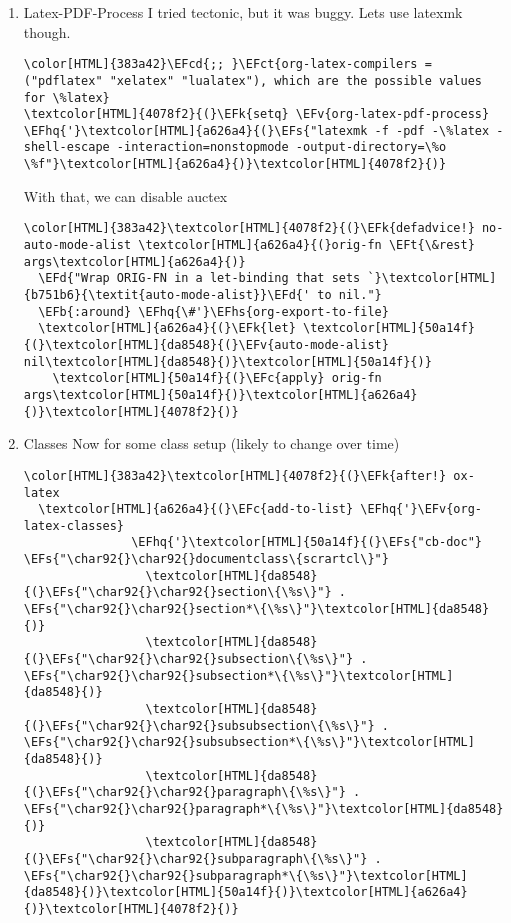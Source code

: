 \documentclass{scrartcl}
\newcommand{\EFk}[1]{\textcolor{EFk}{#1}} %
\newcommand{\EFd}[1]{\textcolor{EFd}{\textit{#1}}} %
\newcommand{\EFt}[1]{\textcolor{EFt}{#1}} %
\newcommand{\EFs}[1]{\textcolor{EFs}{#1}} %
\newcommand{\EFb}[1]{\textcolor{EFb}{#1}} %
\newcommand{\EFct}[1]{\textcolor{EFct}{#1}} %
\newcommand{\EFc}[1]{\textcolor{EFc}{#1}} %
\newcommand{\EFv}[1]{\textcolor{EFv}{#1}} %
\newcommand{\EFcd}[1]{\textcolor{EFcd}{#1}} %
\newcommand{\EFhq}[1]{\textcolor{EFhq}{#1}} %
\newcommand{\EFhs}[1]{\textcolor{EFhs}{#1}} %
\begin{document}
\begin{enumerate}
\item Latex-PDF-Process
\label{sec:org35b1c4f}
I tried tectonic, but it was buggy. Lets use latexmk though.
\begin{Code}
\begin{Verbatim}[]
\color[HTML]{383a42}\EFcd{;; }\EFct{org-latex-compilers = ("pdflatex" "xelatex" "lualatex"), which are the possible values for \%latex}
\textcolor[HTML]{4078f2}{(}\EFk{setq} \EFv{org-latex-pdf-process} \EFhq{'}\textcolor[HTML]{a626a4}{(}\EFs{"latexmk -f -pdf -\%latex -shell-escape -interaction=nonstopmode -output-directory=\%o \%f"}\textcolor[HTML]{a626a4}{)}\textcolor[HTML]{4078f2}{)}
\end{Verbatim}
\end{Code}

With that, we can disable auctex
\begin{Code}
\begin{Verbatim}[]
\color[HTML]{383a42}\textcolor[HTML]{4078f2}{(}\EFk{defadvice!} no-auto-mode-alist \textcolor[HTML]{a626a4}{(}orig-fn \EFt{\&rest} args\textcolor[HTML]{a626a4}{)}
  \EFd{"Wrap ORIG-FN in a let-binding that sets `}\textcolor[HTML]{b751b6}{\textit{auto-mode-alist}}\EFd{' to nil."}
  \EFb{:around} \EFhq{\#'}\EFhs{org-export-to-file}
  \textcolor[HTML]{a626a4}{(}\EFk{let} \textcolor[HTML]{50a14f}{(}\textcolor[HTML]{da8548}{(}\EFv{auto-mode-alist} nil\textcolor[HTML]{da8548}{)}\textcolor[HTML]{50a14f}{)}
    \textcolor[HTML]{50a14f}{(}\EFc{apply} orig-fn args\textcolor[HTML]{50a14f}{)}\textcolor[HTML]{a626a4}{)}\textcolor[HTML]{4078f2}{)}
\end{Verbatim}
\end{Code}

\item Classes
\label{sec:orgf8778f4}
Now for some class setup (likely to change over time)
\begin{Code}
\begin{Verbatim}[]
\color[HTML]{383a42}\textcolor[HTML]{4078f2}{(}\EFk{after!} ox-latex
  \textcolor[HTML]{a626a4}{(}\EFc{add-to-list} \EFhq{'}\EFv{org-latex-classes}
               \EFhq{'}\textcolor[HTML]{50a14f}{(}\EFs{"cb-doc"} \EFs{"\char92{}\char92{}documentclass\{scrartcl\}"}
                 \textcolor[HTML]{da8548}{(}\EFs{"\char92{}\char92{}section\{\%s\}"} . \EFs{"\char92{}\char92{}section*\{\%s\}"}\textcolor[HTML]{da8548}{)}
                 \textcolor[HTML]{da8548}{(}\EFs{"\char92{}\char92{}subsection\{\%s\}"} . \EFs{"\char92{}\char92{}subsection*\{\%s\}"}\textcolor[HTML]{da8548}{)}
                 \textcolor[HTML]{da8548}{(}\EFs{"\char92{}\char92{}subsubsection\{\%s\}"} . \EFs{"\char92{}\char92{}subsubsection*\{\%s\}"}\textcolor[HTML]{da8548}{)}
                 \textcolor[HTML]{da8548}{(}\EFs{"\char92{}\char92{}paragraph\{\%s\}"} . \EFs{"\char92{}\char92{}paragraph*\{\%s\}"}\textcolor[HTML]{da8548}{)}
                 \textcolor[HTML]{da8548}{(}\EFs{"\char92{}\char92{}subparagraph\{\%s\}"} . \EFs{"\char92{}\char92{}subparagraph*\{\%s\}"}\textcolor[HTML]{da8548}{)}\textcolor[HTML]{50a14f}{)}\textcolor[HTML]{a626a4}{)}\textcolor[HTML]{4078f2}{)}
\end{Verbatim}
\end{Code}


\end{enumerate}
\end{document}
